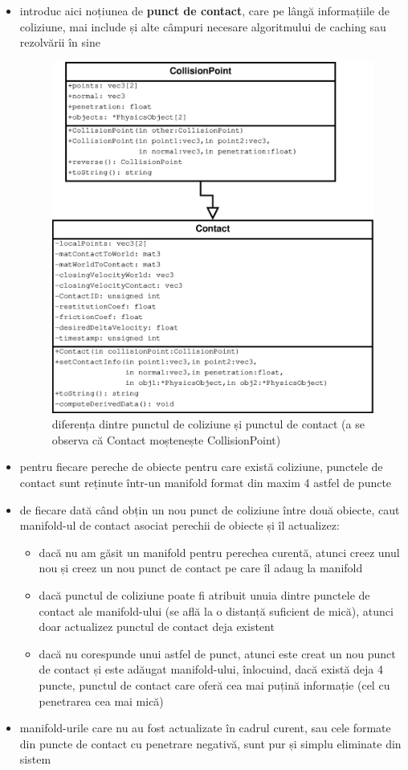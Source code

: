 \documentclass[12pt,a4paper]{report}
\begin{document}
\begin{itemize}
	\item introduc aici noțiunea de \textbf{punct de contact}, care pe lângă informațiile de coliziune, mai include și alte câmpuri necesare algoritmului de caching sau rezolvării în sine
	\begin{figure}[H]
		\centering
		\includegraphics[width=0.85\linewidth]{pics/collisionContact.eps}
		\caption[]{\centering diferența dintre punctul de coliziune și punctul de contact \newline (a se observa că Contact moștenește CollisionPoint)}
		\label{fig:collisionContact}
	\end{figure}
	\item pentru fiecare pereche de obiecte pentru care există coliziune, punctele de contact sunt reținute într-un manifold format din maxim 4 astfel de puncte
	\item de fiecare dată când obțin un nou punct de coliziune între două obiecte, caut manifold-ul de contact asociat perechii de obiecte și îl actualizez:
	\begin{itemize}
		\item dacă nu am găsit un manifold pentru perechea curentă, atunci creez unul nou și creez un nou punct de contact pe care îl adaug la manifold
		\item dacă punctul de coliziune poate fi atribuit unuia dintre punctele de contact ale manifold-ului (se află la o distanță suficient de mică), atunci doar actualizez punctul de contact deja existent
		\item dacă nu corespunde unui astfel de punct, atunci este creat un nou punct de contact și este adăugat manifold-ului, înlocuind, dacă există deja 4 puncte, punctul de contact care oferă cea mai puțină informație (cel cu penetrarea cea mai mică)
	\end{itemize}
	\item manifold-urile care nu au fost actualizate în cadrul curent, sau cele formate din puncte de contact cu penetrare negativă, sunt pur și simplu eliminate din sistem
\end{itemize}
\end{document}
